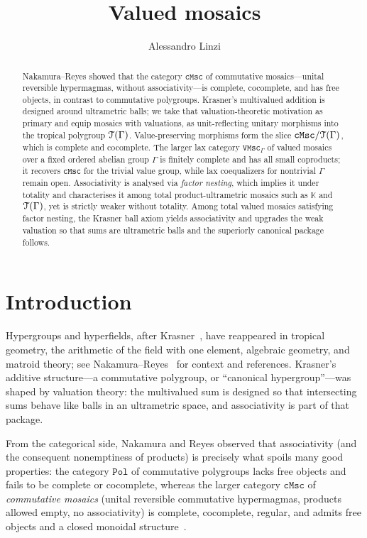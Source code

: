 \documentclass[11pt]{amsart}
\title{Valued mosaics}
\author{Alessandro Linzi}
\theoremstyle{plain}
\theoremstyle{definition}
\theoremstyle{remark}
\newcommand{\T}{\EuScript{T}}
\newcommand{\cMsc}{\mathtt{cMsc}}
\newcommand{\VMscG}{\mathtt{VMsc}_{\Gamma}}
\newcommand{\Pol}{\mathtt{Pol}}
\begin{document}
\begin{abstract}
Nakamura--Reyes showed that the category \(\cMsc\) of commutative mosaics---unital reversible hypermagmas, without associativity---is complete, cocomplete, and has free objects, in contrast to commutative polygroups. Krasner's multivalued addition is designed around ultrametric balls; we take that valuation-theoretic motivation as primary and equip mosaics with valuations, as unit-reflecting unitary morphisms into the tropical polygroup \(\T(\Gamma)\). Value-preserving morphisms form the slice \(\cMsc/\T(\Gamma)\), which is complete and cocomplete. The larger lax category \(\VMscG\) of valued mosaics over a fixed ordered abelian group \(\Gamma\) is finitely complete and has all small coproducts; it recovers \(\cMsc\) for the trivial value group, while lax coequalizers for nontrivial \(\Gamma\) remain open. Associativity is analysed via \emph{factor nesting}, which implies it under totality and characterises it among total product-ultrametric mosaics such as \(\mathbb{K}\) and \(\T(\Gamma)\), yet is strictly weaker without totality. Among total valued mosaics satisfying factor nesting, the Krasner ball axiom yields associativity and upgrades the weak valuation so that sums are ultrametric balls and the superiorly canonical package follows.
\end{abstract}

\maketitle

\section{Introduction}
\label{sec:intro}

Hypergroups and hyperfields, after Krasner~\cite{Kra57}, have reappeared in tropical geometry, the arithmetic of the field with one element, algebraic geometry, and matroid theory; see Nakamura--Reyes~\cite{NR23} for context and references. Krasner's additive structure---a commutative polygroup, or ``canonical hypergroup''---was shaped by valuation theory: the multivalued sum is designed so that intersecting sums behave like balls in an ultrametric space, and associativity is part of that package.

From the categorical side, Nakamura and Reyes observed that associativity (and the consequent nonemptiness of products) is precisely what spoils many good properties: the category \(\Pol\) of commutative polygroups lacks free objects and fails to be complete or cocomplete, whereas the larger category \(\cMsc\) of \emph{commutative mosaics} (unital reversible commutative hypermagmas, products allowed empty, no associativity) is complete, cocomplete, regular, and admits free objects and a closed monoidal structure~\cite{NR23}.
\end{document}
